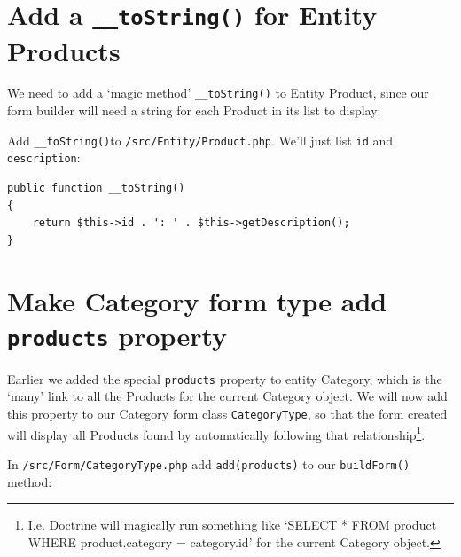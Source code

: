 \documentclass[a4paperpaper,openright]{book}
\newenvironment{Shaded}{}{}
\newcommand{\KeywordTok}[1]{\textcolor[rgb]{0.00,0.44,0.13}{\textbf{#1}}}
\newcommand{\NormalTok}[1]{#1}
\newcommand{\OtherTok}[1]{\textcolor[rgb]{0.00,0.44,0.13}{#1}}
\newcommand{\StringTok}[1]{\textcolor[rgb]{0.25,0.44,0.63}{#1}}
\begin{document}
\hypertarget{add-a-__tostring-for-entity-products}{%
\section{\texorpdfstring{Add a \texttt{\_\_toString()} for Entity
Products}{Add a \_\_toString() for Entity Products}}\label{add-a-__tostring-for-entity-products}}

We need to add a `magic method' \texttt{\_\_toString()} to Entity
Product, since our form builder will need a string for each Product in
its list to display:

Add \texttt{\_\_toString()}to \texttt{/src/Entity/Product.php}. We'll
just list \texttt{id} and \texttt{description}:

\begin{verbatim}
public function __toString()
{
    return $this->id . ': ' . $this->getDescription();
}
\end{verbatim}

\hypertarget{make-category-form-type-add-products-property}{%
\section{\texorpdfstring{Make Category form type add \texttt{products}
property}{Make Category form type add products property}}\label{make-category-form-type-add-products-property}}

Earlier we added the special \texttt{products} property to entity
Category, which is the `many' link to all the Products for the current
Category object. We will now add this property to our Category form
class \texttt{CategoryType}, so that the form created will display all
Products found by automatically following that relationship\footnote{I.e.
  Doctrine will magically run something like `SELECT * FROM product
  WHERE product.category = category.id' for the current Category object.}.

In \texttt{/src/Form/CategoryType.php} add
\texttt{add(\textquotesingle{}products\textquotesingle{})} to our
\texttt{buildForm(\textasciigrave{}\textasciigrave{}\textasciigrave{})}
method:

\begin{Shaded}
\end{Shaded}
\end{document}
